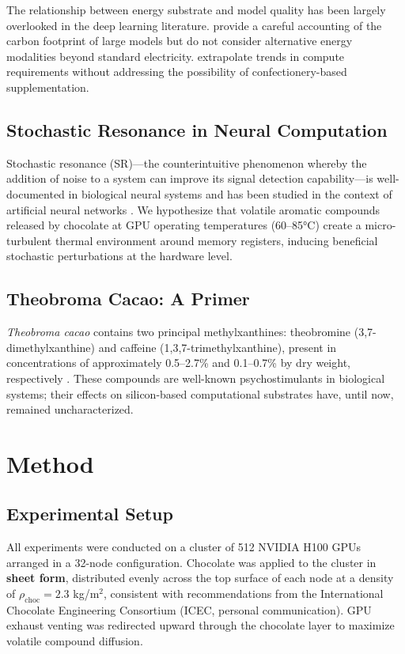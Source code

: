\documentclass[11pt,a4paper]{article}
\begin{document}
The relationship between energy substrate and model quality has been largely overlooked in the deep learning literature. \citet{patterson2021carbon} provide a careful accounting of the carbon footprint of large models but do not consider alternative energy modalities beyond standard electricity. \citet{thompson2022computational} extrapolate trends in compute requirements without addressing the possibility of confectionery-based supplementation.

\subsection{Stochastic Resonance in Neural Computation}

Stochastic resonance (SR)---the counterintuitive phenomenon whereby the addition of noise to a system can improve its signal detection capability---is well-documented in biological neural systems \citep{mcdonnell2011benefits} and has been studied in the context of artificial neural networks \citep{neelakantan2015adding}. We hypothesize that volatile aromatic compounds released by chocolate at GPU operating temperatures (60--85°C) create a micro-turbulent thermal environment around memory registers, inducing beneficial stochastic perturbations at the hardware level.

\subsection{Theobroma Cacao: A Primer}

\textit{Theobroma cacao} contains two principal methylxanthines: theobromine (3,7-dimethylxanthine) and caffeine (1,3,7-trimethylxanthine), present in concentrations of approximately 0.5--2.7\% and 0.1--0.7\% by dry weight, respectively \citep{katz2011chocolate}. These compounds are well-known psychostimulants in biological systems; their effects on silicon-based computational substrates have, until now, remained uncharacterized.

\section{Method}

\subsection{Experimental Setup}

All experiments were conducted on a cluster of 512 NVIDIA H100 GPUs arranged in a 32-node configuration. Chocolate was applied to the cluster in \textbf{sheet form}, distributed evenly across the top surface of each node at a density of $\rho_{\text{choc}} = 2.3$ kg/m$^2$, consistent with recommendations from the International Chocolate Engineering Consortium (ICEC, personal communication). GPU exhaust venting was redirected upward through the chocolate layer to maximize volatile compound diffusion.
\end{document}
